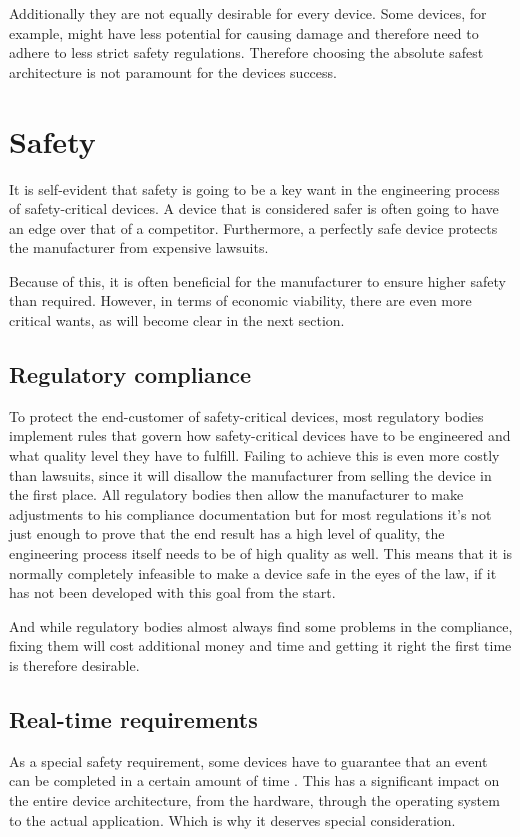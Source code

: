 Additionally they are not equally desirable for every device. Some devices, for example, might have less potential for causing damage and therefore need to adhere to less strict safety regulations. Therefore choosing the absolute safest architecture is not paramount for the devices success.

\section{Safety}
It is self-evident that safety is going to be a key want in the engineering process of safety-critical devices. A device that is considered safer is often going to have an edge over that of a competitor. Furthermore, a perfectly safe device protects the manufacturer from expensive lawsuits.

Because of this, it is often beneficial for the manufacturer to ensure higher safety than required. However, in terms of economic viability, there are even more critical wants, as will become clear in the next section.

\subsection{Regulatory compliance}
To protect the end-customer of safety-critical devices, most regulatory bodies implement rules that govern how safety-critical devices have to be engineered and what quality level they have to fulfill.
Failing to achieve this is even more costly than lawsuits, since it will disallow the manufacturer from selling the device in the first place. All regulatory bodies then allow the manufacturer to make adjustments to his compliance documentation but for most regulations it’s not just enough to prove that the end result has a high level of quality, the engineering process itself needs to be of high quality as well. This means that it is normally completely infeasible to make a device safe in the eyes of the law, if it has not been developed with this goal from the start. 

And while regulatory bodies almost always find some problems in the compliance, fixing them will cost additional money and time and getting it right the first time is therefore desirable.

\subsection{Real-time requirements}
As a special safety requirement, some devices have to guarantee that an event can be completed in a certain amount of time \cite{shin1994real}. This has a significant impact on the entire device architecture, from the hardware, through the operating system to the actual application. Which is why it deserves special consideration.

